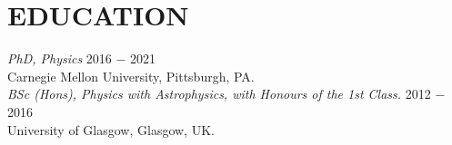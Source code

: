 
\section{EDUCATION}

{\sl PhD, Physics}  \hfill  2016 $-$ 2021 \\
Carnegie Mellon University, Pittsburgh, PA. \\

{\sl BSc (Hons), Physics with Astrophysics, with Honours of the 1st Class.}  \hfill  2012 $-$ 2016 \\
University of Glasgow, Glasgow, UK. \\

